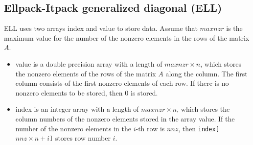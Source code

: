 \documentclass[a4paper]{article}
\begin{document}
\newpage
\subsection{Ellpack-Itpack generalized diagonal (ELL)}
ELL uses two arrays {\ttfamily index} and {\ttfamily value} to store
data. Assume that $maxnzr$ is the maximum value for the number of the nonzero elements in the rows of the matrix $A$.
\begin{itemize}
\item {\ttfamily value} is a double precision array with a length of
      $maxnzr \times n$, which stores the nonzero elements of the rows
      of the matrix $A$ along the column. The first column consists of
      the first nonzero elements of each row. If there is no nonzero elements to be stored, then $0$ is stored.
\item {\ttfamily index} is an integer array with a length of $maxnzr
      \times n$, which stores the column numbers of the nonzero
      elements stored in the array {\ttfamily value}. If the number of
      the nonzero elements in the $i$-th row is $nnz$, then {\tt index[$nnz
      \times n + i$]} stores row number $i$.
\end{itemize}
\end{document}
